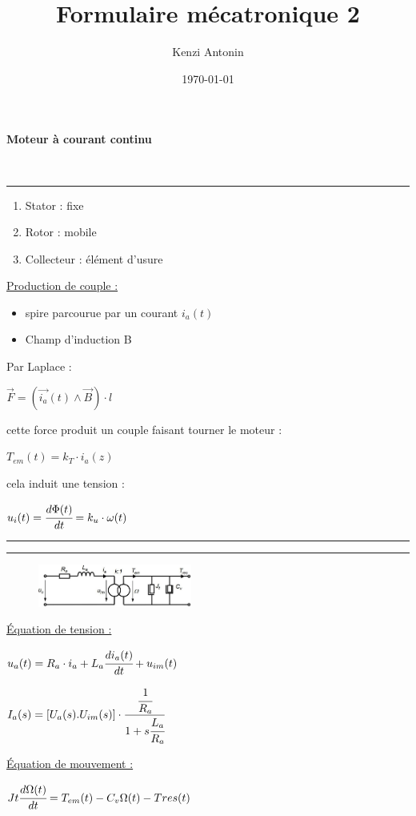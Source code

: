 \documentclass[	DIV=calc,%
							paper=a4,%
							fontsize=10pt,%
							twocolumn]{scrartcl} %
\title{Formulaire mécatronique 2} %
\author{Kenzi Antonin}	%
\date{\vspace{-30pt} \today} %
\newcommand{\hformbar}[1]{\bigskip \hrule \vspace{1pt} \hrule \vspace{5pt}} %
\newcommand{\initial}[1]{%
     \lettrine[lines=3,lhang=0.3,nindent=0em]{
     				\color{DarkGoldenrod}
     				{\textsf{#1}}}{}}
\newcounter{mycounter}
\newcommand{\formdesc}[1]{\large\textbf{#1} \addtocounter{mycounter}{1} \hfill \themycounter \\ \vspace{-3mm} \hrule \vspace{2mm}}
\newcommand{\formtitle}[1]{\large\underline{#1}}
\begin{document}
\maketitle
\thispagestyle{fancy} 	%

\formdesc{Moteur à courant continu}
\begin{enumerate}
    \item Stator : fixe
    \item Rotor : mobile
    \item Collecteur : élément d'usure 
\end{enumerate}

\formtitle{Production de couple :}
\begin{itemize}
    \item spire parcourue par un courant $i_a(t)$
    \item Champ d'induction B 
\end{itemize}
Par Laplace :

{\hfill $\vec{F} = (\vec{i_a}(t) \wedge  \vec{B})\cdot l$\hfill}

cette force produit un couple faisant tourner le moteur : 

{\hfill $T_{em}(t) = k_T \cdot i_a(z)$\hfill}

cela induit une tension :

{\hfill $u_i(t) = \cfrac{d \Phi(t)}{dt}=k_u \cdot \omega(t)$\hfill}

\hformbar

\formdesc{Équations du moteur Dc et de la charge}

{ \vspace{-3mm}
    \begin{figure}[H]
        \includegraphics[width=0.45\textwidth]{img/equation_mot.JPG}
    \end{figure}
}
\formtitle{Équation de tension : }

{\hfill $u_a(t) = R_a \cdot i_a + L_a \cfrac{di_a(t)}{dt}+u_{im}(t)$\hfill}

{\hfill $I_a(s) = [U_a(s).U_{im}(s)] \cdot \cfrac{ \cfrac{1}{R_a}}{1+s\cfrac{L_a}{R_a}}  $\hfill}


\formtitle{Équation de mouvement :} 

{\hfill $Jt \cfrac{d\Omega(t)}{dt} = T_{em}(t) - C_v \Omega(t) - Tres(t) $\hfill}
\end{document}
